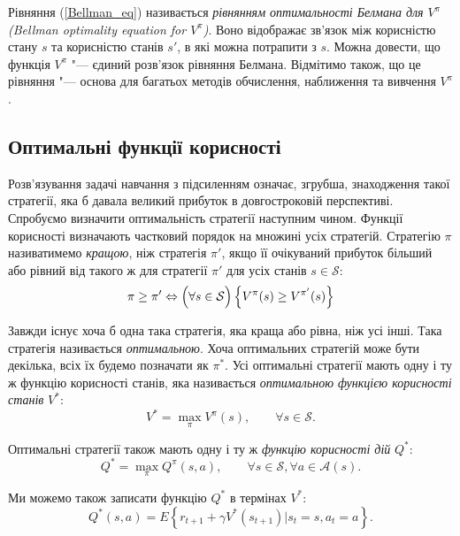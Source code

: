 \documentclass[a4paper,10pt]{article}
\begin{document}
Рівняння (\ref{Bellman_eq}) називається \emph{рівнянням оптимальності Белмана для $V^\pi$ (Bellman optimality equation for $V^\pi$)}. Воно відображає зв'язок між корисністю стану $s$ та корисністю станів $s'$, в які можна потрапити з $s$. Можна довести, що функція $V^\pi$ "--- єдиний розв'язок рівняння Белмана. Відмітимо також, що це рівняння "--- основа для багатьох методів обчислення, наближення та вивчення $V^\pi$.

\subsection{Оптимальні функції корисності}

Розв'язування задачі навчання з підсиленням означає, згрубша, знаходження такої стратегії, яка б давала великий прибуток в довгостроковій перспективі. Спробуємо визначити оптимальність стратегії наступним чином. Функції корисності визначають частковий порядок на множині усіх стратегій. Стратегію $\pi$ називатимемо \emph{кращою}, ніж стратегія $\pi '$, якщо її очікуваний прибуток більший або рівний від такого ж для стратегії $\pi '$ для усіх станів $s \in \mathcal{S}$:
\begin{equation}
\pi \geq \pi ' \Leftrightarrow \Bigl(\forall s \in \mathcal{S}\Bigr)\left\{ V^\pi(s) \geq V^{\pi '}(s) \right\}
\end{equation}

Завжди існує хоча б одна така стратегія, яка краща або рівна, ніж усі інші. Така стратегія називається \emph{оптимальною}. Хоча оптимальних стратегій може бути декілька, всіх їх будемо позначати як $\pi^*$. Усі оптимальні стратегії мають одну і ту ж функцію корисності станів, яка називається \emph{оптимальною функцією корисності станів} $V^*$:
\begin{equation}
V^* = \max_\pi V^\pi(s),\qquad \forall s \in \mathcal{S}.
\end{equation}

Оптимальні стратегії також мають одну і ту ж \emph{функцію корисності дій} $Q^*$:
\begin{equation}
Q^* = \max_\pi Q^\pi(s,a),\qquad \forall s \in \mathcal{S}, \forall a \in \mathcal{A}(s).
\end{equation}

Ми можемо також записати функцію $Q^*$ в термінах $V^*$:
\begin{equation}
Q^*(s,a) = E\left\{r_{t+1} + \gamma V^*(s_{t+1}) \Big| s_t=s, a_t=a \right\}.
\end{equation}
\end{document}
